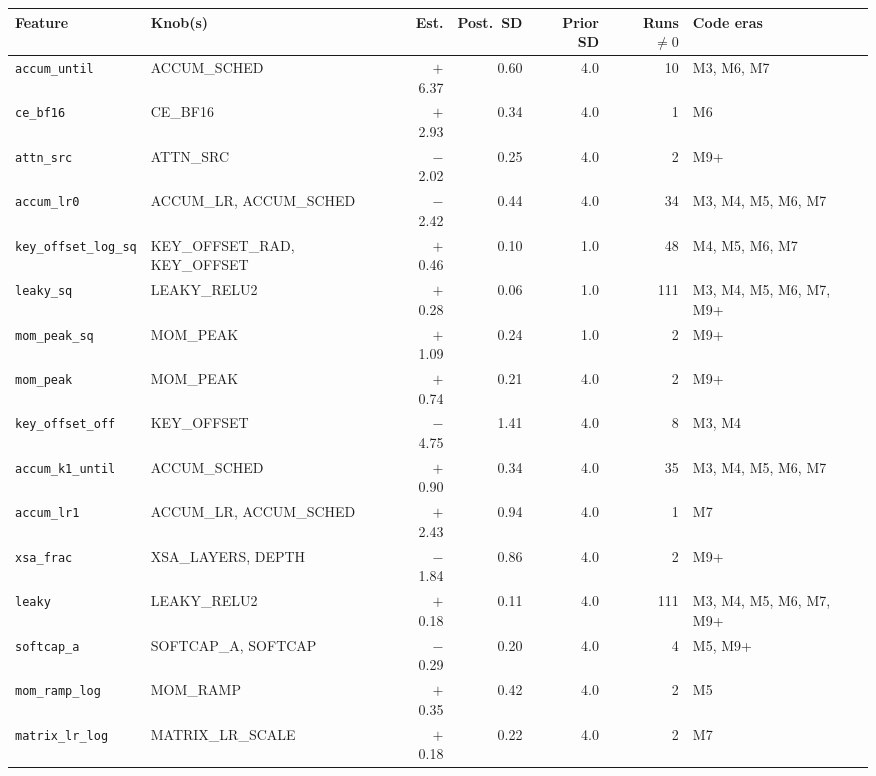 {\footnotesize\setlength{\tabcolsep}{4pt}
\begin{tabular}{@{}lp{3.6cm}rrrrp{2.6cm}@{}}
\toprule
Feature & Knob(s) & Est. & Post.\ SD & Prior SD & Runs $\neq0$ & Code eras \\
\midrule
\texttt{accum\_until} & ACCUM\_SCHED & \ensuremath{+}6.37 & 0.60 & 4.0 & 10 & M3, M6, M7 \\
\texttt{ce\_bf16} & CE\_BF16 & \ensuremath{+}2.93 & 0.34 & 4.0 & 1 & M6 \\
\texttt{attn\_src} & ATTN\_SRC & \ensuremath{-}2.02 & 0.25 & 4.0 & 2 & M9+ \\
\texttt{accum\_lr0} & ACCUM\_LR, ACCUM\_SCHED & \ensuremath{-}2.42 & 0.44 & 4.0 & 34 & M3, M4, M5, M6, M7 \\
\texttt{key\_offset\_log\_sq} & KEY\_OFFSET\_RAD, KEY\_OFFSET & \ensuremath{+}0.46 & 0.10 & 1.0 & 48 & M4, M5, M6, M7 \\
\texttt{leaky\_sq} & LEAKY\_RELU2 & \ensuremath{+}0.28 & 0.06 & 1.0 & 111 & M3, M4, M5, M6, M7, M9+ \\
\texttt{mom\_peak\_sq} & MOM\_PEAK & \ensuremath{+}1.09 & 0.24 & 1.0 & 2 & M9+ \\
\texttt{mom\_peak} & MOM\_PEAK & \ensuremath{+}0.74 & 0.21 & 4.0 & 2 & M9+ \\
\texttt{key\_offset\_off} & KEY\_OFFSET & \ensuremath{-}4.75 & 1.41 & 4.0 & 8 & M3, M4 \\
\texttt{accum\_k1\_until} & ACCUM\_SCHED & \ensuremath{+}0.90 & 0.34 & 4.0 & 35 & M3, M4, M5, M6, M7 \\
\texttt{accum\_lr1} & ACCUM\_LR, ACCUM\_SCHED & \ensuremath{+}2.43 & 0.94 & 4.0 & 1 & M7 \\
\texttt{xsa\_frac} & XSA\_LAYERS, DEPTH & \ensuremath{-}1.84 & 0.86 & 4.0 & 2 & M9+ \\
\texttt{leaky} & LEAKY\_RELU2 & \ensuremath{+}0.18 & 0.11 & 4.0 & 111 & M3, M4, M5, M6, M7, M9+ \\
\texttt{softcap\_a} & SOFTCAP\_A, SOFTCAP & \ensuremath{-}0.29 & 0.20 & 4.0 & 4 & M5, M9+ \\
\texttt{mom\_ramp\_log} & MOM\_RAMP & \ensuremath{+}0.35 & 0.42 & 4.0 & 2 & M5 \\
\texttt{matrix\_lr\_log} & MATRIX\_LR\_SCALE & \ensuremath{+}0.18 & 0.22 & 4.0 & 2 & M7 \\
\bottomrule
\end{tabular}
}
